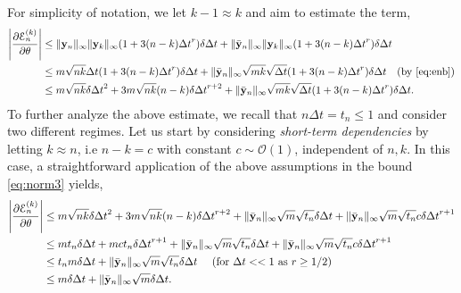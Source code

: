 \documentclass{article} \usepackage{iclr2021_conference,times}
\newcommand{\by}{{\bf y}}
\newcommand{\ord}{{\mathcal O}}
\newcommand{\Dt}{{\Delta t}}
\newcommand{\E}{\EuScript{E}}
\begin{document}
For simplicity of notation, we let $k-1 \approx k$ and aim to estimate the term,
\begin{equation}
\label{eq:norm3}
\begin{aligned}
\left | \frac{\partial \E^{(k)}_n}{\partial \theta} \right | &\leq \|\by_n\|_\infty\|\by_k\|_\infty(1 + 3(n-k)\Dt^r) \delta \Dt + \|\bar{\by}_n\|_\infty\|\by_k\|_\infty(1 + 3(n-k)\Dt^r) \delta \Dt\\
&\leq m\sqrt{nk}\Dt (1 + 3(n-k)\Dt^r) \delta \Dt + \|\bar{\by}_n\|_\infty\sqrt{mk}\sqrt{\Dt} (1 + 3(n-k)\Dt^r) \delta \Dt\quad ({\rm by}~ \eqref{eq:enb}) \\
&\leq m\sqrt{nk}\delta \Dt^2 + 3m\sqrt{nk}(n-k)\delta \Dt^{r+2}+\|\bar{\by}_n\|_\infty\sqrt{mk}\sqrt{\Dt} (1 + 3(n-k)\Dt^r) \delta \Dt.
\end{aligned}
\end{equation}
To further analyze the above estimate, we recall that $n\Dt = t_n \leq 1$ and consider two different regimes. Let us start by considering \emph{short-term dependencies} by letting $k \approx n$, i.e $n-k = c$ with constant $c \sim \ord(1)$, independent of $n,k$. In this case, a
straightforward application of the above assumptions in the bound \eqref{eq:norm3} yields,
 \begin{equation}
\label{eq:norm30}
\begin{aligned}
\left | \frac{\partial \E^{(k)}_n}{\partial \theta} \right | &\leq m\sqrt{nk}\delta \Dt^2 + 3m\sqrt{nk}(n-k)\delta \Dt^{r+2}+\|\bar{\by}_n\|_\infty\sqrt{m}\sqrt{t_n}\delta \Dt +\|\bar{\by}_n\|_\infty\sqrt{m}\sqrt{t_n}c\delta \Dt^{r+1}  \\
&\leq mt_n\delta \Dt + mct_n\delta \Dt^{r+1} + \|\bar{\by}_n\|_\infty\sqrt{m}\sqrt{t_n}\delta \Dt +\|\bar{\by}_n\|_\infty\sqrt{m}\sqrt{t_n}c\delta \Dt^{r+1}  \\
&\leq  t_n m \delta \Dt +  \|\bar{\by}_n\|_\infty\sqrt{m}\sqrt{t_n}\delta \Dt\quad ~({\rm for}~\Dt << 1~{\rm as}~r \geq 1/2) \\
&\leq  m \delta \Dt + \|\bar{\by}_n\|_\infty\sqrt{m}\delta \Dt.
\end{aligned}
\end{equation}
\end{document}
